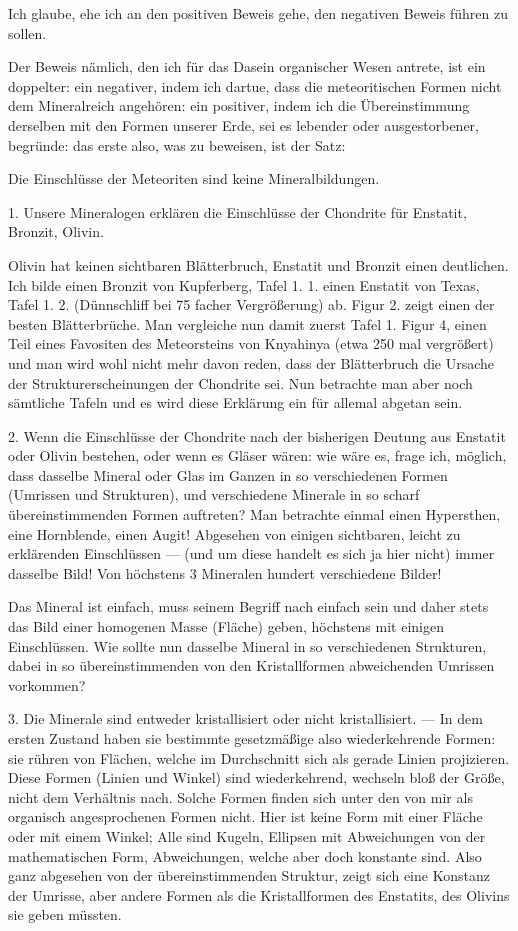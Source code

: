 \documentclass[a4paper, 12pt, oneside]{article}
\begin{document}
Ich glaube, ehe ich an den positiven Beweis gehe, den negativen Beweis führen zu sollen.

Der Beweis nämlich, den ich für das Dasein organischer Wesen antrete, ist ein doppelter: ein negativer, indem ich dartue, dass die meteoritischen Formen nicht dem Mineralreich angehören: ein positiver, indem ich die Übereinstimmung derselben mit den Formen unserer Erde, sei es lebender oder ausgestorbener, begründe: das erste also, was zu beweisen, ist der Satz:

Die Einschlüsse der Meteoriten sind keine Mineralbildungen.

1. Unsere Mineralogen erklären die Einschlüsse der Chondrite für Enstatit, Bronzit, Olivin.

Olivin hat keinen sichtbaren Blätterbruch, Enstatit und Bronzit einen deutlichen. Ich bilde einen Bronzit von Kupferberg, Tafel 1. 1. einen Enstatit von Texas, Tafel 1. 2. (Dünnschliff bei 75 facher Vergrößerung) ab. Figur 2. zeigt einen der besten Blätterbrüche. Man vergleiche nun damit zuerst Tafel 1. Figur 4, einen Teil eines Favositen des Meteorsteins von Knyahinya (etwa 250 mal vergrößert) und man wird wohl nicht mehr davon reden, dass der Blätterbruch die Ursache der Strukturerscheinungen der Chondrite sei. Nun betrachte man aber noch sämtliche Tafeln und es wird diese Erklärung ein für allemal abgetan sein.

2. Wenn die Einschlüsse der Chondrite nach der bisherigen Deutung aus Enstatit oder Olivin bestehen, oder wenn es Gläser wären: wie wäre es, frage ich, möglich, dass dasselbe Mineral oder Glas im Ganzen in so verschiedenen Formen (Umrissen und Strukturen), und verschiedene Minerale in so scharf übereinstimmenden Formen auftreten? Man betrachte einmal einen Hypersthen, eine Hornblende, einen Augit! Abgesehen von einigen sichtbaren, leicht zu erklärenden Einschlüssen — (und um diese handelt es sich ja hier nicht) immer dasselbe Bild! Von höchstens 3 Mineralen hundert verschiedene Bilder!

Das Mineral ist einfach, muss seinem Begriff nach einfach sein und daher stets das Bild einer homogenen Masse (Fläche) geben, höchstens mit einigen Einschlüssen. Wie sollte nun dasselbe Mineral in so verschiedenen Strukturen, dabei in so übereinstimmenden von den Kristallformen abweichenden Umrissen vorkommen?

3. Die Minerale sind entweder kristallisiert oder nicht kristallisiert. — In dem ersten Zustand haben sie bestimmte gesetzmäßige also wiederkehrende Formen: sie rühren von Flächen, welche im Durchschnitt sich als gerade Linien projizieren. Diese Formen (Linien und Winkel) sind wiederkehrend, wechseln bloß der Größe, nicht dem Verhältnis nach. Solche Formen finden sich unter den von mir als organisch angesprochenen Formen nicht. Hier ist keine Form mit einer Fläche oder mit einem Winkel; Alle sind Kugeln, Ellipsen mit Abweichungen von der mathematischen Form, Abweichungen, welche aber doch konstante sind. Also ganz abgesehen von der übereinstimmenden Struktur, zeigt sich eine Konstanz der Umrisse, aber andere Formen als die Kristallformen des Enstatits, des Olivins sie geben müssten.
\end{document}
